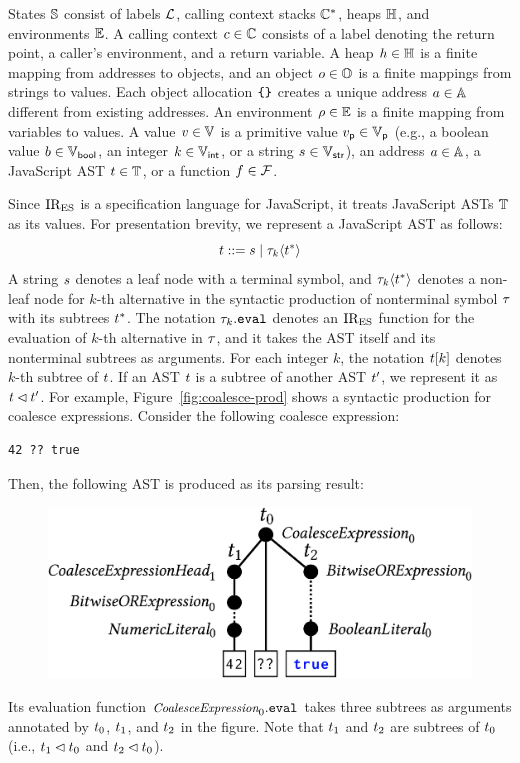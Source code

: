 States $\mathbb{S}$ consist of labels $\mathcal{L}$, calling context stacks
$\mathbb{C}^*$, heaps $\mathbb{H}$, and environments $\mathbb{E}$.  A calling context
$c \in \mathbb{C}$ consists of a label denoting the return point, a caller's
environment, and a return variable.  A heap $h \in \mathbb{H}$ is a finite
mapping from addresses to objects, and an object $o \in \mathbb{O}$ is a finite
mappings from strings to values.  Each object allocation $\texttt{\{} \texttt{\}}$ creates a
unique address $a \in \mathbb{A}$ different from existing addresses.  An
environment $\rho \in \mathbb{E}$ is a finite mapping from variables to values. A
value $v \in \mathbb{V}$ is a primitive value $v_{\textsf{p}} \in \mathbb{V}_{\textsf{p}}$ (e.g., a
boolean value $b \in \mathbb{V}_{\textsf{bool}}$, an integer $k \in \mathbb{V}_{\textsf{int}}$, or a string
$s \in \mathbb{V}_{\textsf{str}}$), an address $a \in \mathbb{A}$, a JavaScript AST $t
\in \mathbb{T}$, or a function $f \in \mathcal{F}$.

Since $\text{IR}_\text{ES}$ is a specification language for JavaScript, it treats JavaScript
ASTs $\mathbb{T}$ as its values. For presentation brevity, we represent a JavaScript
AST as follows:
\[
  t ::= s \mid \tau_k \langle t^* \rangle
\]
A string $s$ denotes a leaf node with a terminal symbol, and $\tau_k \langle
t^* \rangle$ denotes a non-leaf node for $k$-th alternative in the syntactic
production of nonterminal symbol $\tau$ with its subtrees $t^*$.  The notation
$\tau_k.\texttt{eval}$ denotes an $\text{IR}_\text{ES}$ function for the evaluation of $k$-th
alternative in $\tau$, and it takes the AST itself and its nonterminal subtrees
as arguments. For each integer $k$, the notation $t[k]$ denotes $k$-th
subtree of $t$. If an AST $t$ is a subtree of another AST $t'$, we
represent it as $t \lhd t'$.  For example,
Figure~\ref{fig:coalesce-prod} shows a syntactic production for coalesce
expressions.  Consider the following coalesce expression:
\begin{lstlisting}[style=JS]
                    42 ?? true
\end{lstlisting}
Then, the following AST is produced as its parsing result:
\begin{figure}[H]
  \includegraphics[width=.8\columnwidth]{img/ast-example.png}
\end{figure}
\noindent Its evaluation function $\textit{\small CoalesceExpression}_0.\texttt{eval}$ takes
three subtrees as arguments annotated by $t_0$, $t_1$, and $t_2$ in
the figure. Note that $t_1$ and $t_2$ are subtrees of $t_0$ (i.e.,
$t_1 \lhd t_0$ and $t_2 \lhd t_0$).


